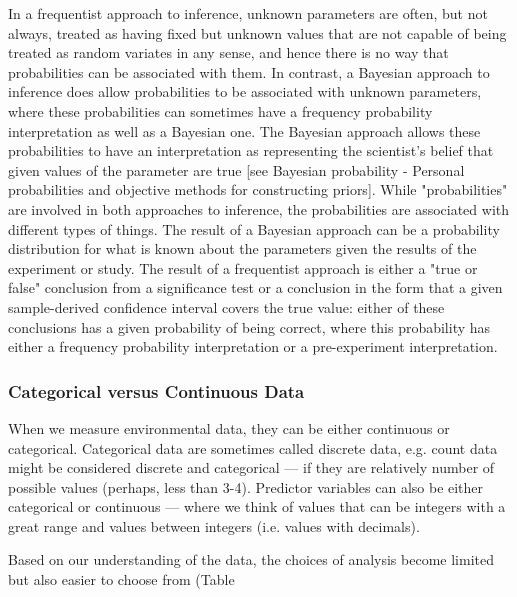 \documentclass{article}\usepackage[]{graphicx}\usepackage[]{color}
\begin{document}
In a frequentist approach to inference, unknown parameters are often, but not always, treated as having fixed but unknown values that are not capable of being treated as random variates in any sense, and hence there is no way that probabilities can be associated with them. In contrast, a Bayesian approach to inference does allow probabilities to be associated with unknown parameters, where these probabilities can sometimes have a frequency probability interpretation as well as a Bayesian one. The Bayesian approach allows these probabilities to have an interpretation as representing the scientist's belief that given values of the parameter are true [see Bayesian probability - Personal probabilities and objective methods for constructing priors].
While "probabilities" are involved in both approaches to inference, the probabilities are associated with different types of things. The result of a Bayesian approach can be a probability distribution for what is known about the parameters given the results of the experiment or study. The result of a frequentist approach is either a "true or false" conclusion from a significance test or a conclusion in the form that a given sample-derived confidence interval covers the true value: either of these conclusions has a given probability of being correct, where this probability has either a frequency probability interpretation or a pre-experiment interpretation.

\subsubsection{Categorical versus Continuous Data}

When we measure environmental data, they can be either continuous or categorical. Categorical data are sometimes called discrete data, e.g. count data might be considered discrete and categorical --- if they are relatively number of possible values (perhaps, less than 3-4). Predictor variables can also be either categorical or continuous --- where we think of values that can be integers with a great range and values between integers (i.e. values with decimals).

Based on our understanding of the data, the choices of analysis become limited but also easier to choose from (Table %
\end{document}
